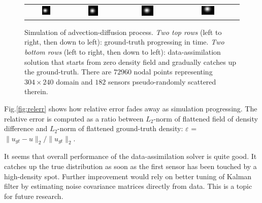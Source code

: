 \documentclass[acmsmall,review,anonymous]{acmart}\settopmatter{printfolios=true,printccs=false,printacmref=false}
\begin{document}
\begin{figure}
\begin{tabular}{cccc}
\includegraphics[width=0.23\textwidth]{images/field-t=2414} & 
\includegraphics[width=0.23\textwidth]{images/field-t=3006} &
\includegraphics[width=0.23\textwidth]{images/field-t=3597} & 
\includegraphics[width=0.23\textwidth]{images/field-t=4089} 
\end{tabular}
\caption{Simulation of advection-diffusion process. \textit{Two top rows} (left to right, then down to left): ground-truth progressing in time. \textit{Two bottom rows} (left to right, then down to left): data-assimilation solution that starts from zero density field and gradually catches up the ground-truth. There are $72960$ nodal points representing $304{\times}240$ domain and $182$ sensors pseudo-randomly scattered therein.}
\label{fig:density}
\end{figure}

Fig.\ref{fig:relerr} shows how relative error fades away as simulation progressing. The relative error is computed as a ratio between $L_2$-norm of flattened field of density difference and  $L_2$-norm of flattened ground-truth density: $\varepsilon$ = $\|u_{gt} - u\|_2/\|u_{gt}\|_2$.

It seems that overall performance of the data-assimilation solver is quite good. It catches up the true distribution as soon as the first sensor has been touched by a high-density spot.  Further improvement would rely on better tuning of Kalman filter by estimating noise covariance matrices directly from data. This is a topic for future research.
\end{document}
